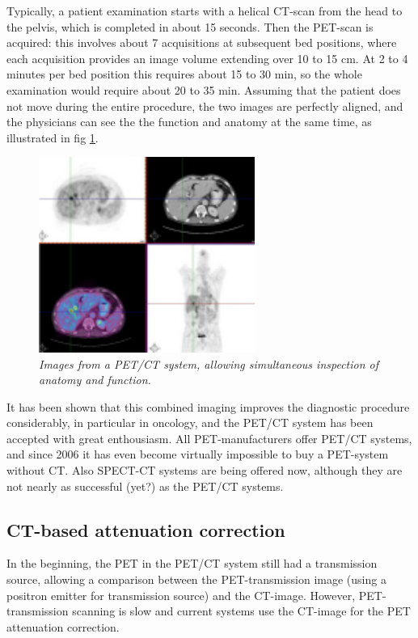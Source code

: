 \documentclass[11pt,oneside]{book}
\begin{document}
Typically, a patient examination starts with a helical CT-scan from the
head to the pelvis, which is completed in about 15 seconds. Then the
PET-scan is acquired: this involves about 7 acquisitions at subsequent
bed positions, where each acquisition provides an image volume
extending over 10 to 15 cm. At 2 to 4 minutes per bed position this
requires about 15 to 30 min, so the whole examination would require
about 20 to 35 min. Assuming that the patient does not move during the
entire procedure, the two images are perfectly aligned, and the
physicians can see the the function and anatomy at the same time, as
illustrated in fig \ref{fig:petctimg}.
%
\begin{figure}[tb]
\centering
\includegraphics[width=0.63\textwidth]{figs/fig_petctimg.pdf}
\caption{\label{fig:petctimg} \emph{Images from a PET/CT system, allowing
simultaneous inspection of anatomy and function.}}
\end{figure}

It has been shown that this combined imaging improves the diagnostic
procedure considerably, in particular in oncology, and the PET/CT
system has been accepted with great enthousiasm. All PET-manufacturers
offer PET/CT systems, and since 2006 it has even become virtually
impossible to buy a PET-system without CT. Also SPECT-CT systems are
being offered now, although they are not nearly as successful (yet?)
as the PET/CT systems.

\subsection{CT-based attenuation correction}
In the beginning, the PET in the PET/CT system still had a transmission
source, allowing a comparison between the PET-transmission image (using a
positron emitter for transmission source) and the CT-image. However,
PET-transmission scanning is slow and current systems use the CT-image for the
PET attenuation correction.
\end{document}
